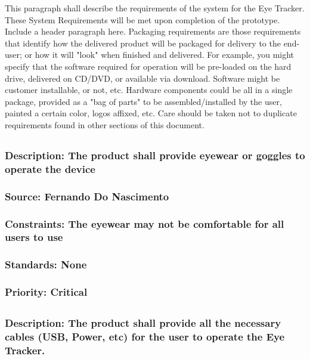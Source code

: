 This paragraph shall describe the requirements of the system for the Eye Tracker. These System Requirements will be met upon completion of the prototype.
Include a header paragraph here. Packaging requirements are those requirements that identify how the delivered product will be packaged for delivery to the end-user; or how it will "look" when finished and delivered. For example, you might specify that the software required for operation will be pre-loaded on the hard drive, delivered on CD/DVD, or available via download. Software might be customer installable, or not, etc. Hardware components could be all in a single package, provided as a "bag of parts" to be assembled/installed by the user, painted a certain color, logos affixed, etc. Care should be taken not to duplicate requirements found in other sections of this document.

\subsection{\bfEyewear}
\subsubsection{Description: The product shall provide eyewear or goggles to operate the device}
\subsubsection{Source: Fernando Do Nascimento}
\subsubsection{Constraints: The eyewear may not be comfortable for all users to use}
\subsubsection{Standards: None}
\subsubsection{Priority: Critical}

\subsection{\bfCables}
\subsubsection{Description: The product shall provide all the necessary cables (USB, Power, etc) for the user to operate the Eye Tracker.}
